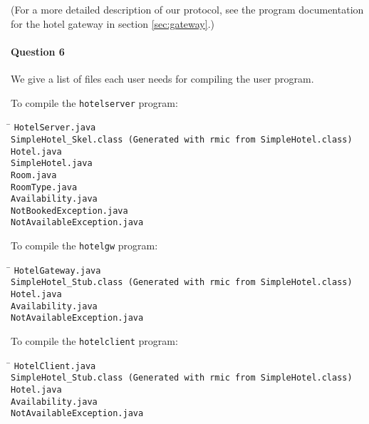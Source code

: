 \documentclass[a4paper,10pt]{article}
\begin{document}
(For a more detailed description of our protocol, see the program
documentation for the hotel gateway in section \ref{sec:gateway}.)

\paragraph{Question 6}
We give a list of files each user needs for compiling the user
program.

To compile the \texttt{hotelserver} program:
\begin{tabbing}
\hspace{20pt}\=\kill
 \> \texttt{HotelServer.java} \\
 \> \texttt{SimpleHotel\_Skel.class \textrm{(Generated with \texttt{rmic} from \texttt{SimpleHotel.class})}} \\
 \> \texttt{Hotel.java} \\
 \> \texttt{SimpleHotel.java} \\
 \> \texttt{Room.java} \\
 \> \texttt{RoomType.java} \\
 \> \texttt{Availability.java} \\
 \> \texttt{NotBookedException.java} \\
 \> \texttt{NotAvailableException.java}
\end{tabbing}

To compile the \texttt{hotelgw} program:
\begin{tabbing}
\hspace{20pt}\=\kill
 \> \texttt{HotelGateway.java} \\
 \> \texttt{SimpleHotel\_Stub.class \textrm{(Generated with \texttt{rmic} from \texttt{SimpleHotel.class})}} \\
 \> \texttt{Hotel.java} \\
 \> \texttt{Availability.java} \\
 \> \texttt{NotAvailableException.java}
\end{tabbing}

To compile the \texttt{hotelclient} program:
\begin{tabbing}
\hspace{20pt}\=\kill
 \> \texttt{HotelClient.java} \\
 \> \texttt{SimpleHotel\_Stub.class \textrm{(Generated with \texttt{rmic} from \texttt{SimpleHotel.class})}} \\
 \> \texttt{Hotel.java} \\
 \> \texttt{Availability.java} \\
 \> \texttt{NotAvailableException.java}
\end{tabbing}
\end{document}
